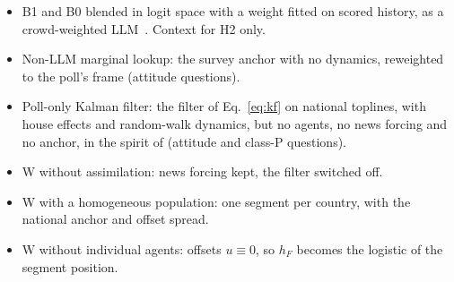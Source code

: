 \documentclass[11pt]{article}
\begin{document}
\begin{itemize}
  \item[\textbf{B4}] B1 and B0 blended in logit space with a weight fitted on scored history, as a crowd-weighted LLM~\citep{halawi2024approaching}. Context for H2 only.
  \item[\textbf{L}] Non-LLM marginal lookup: the survey anchor with no dynamics, reweighted to the poll's frame (attitude questions).
  \item[\textbf{P}] Poll-only Kalman filter: the filter of Eq.~\eqref{eq:kf} on national toplines, with house effects and random-walk dynamics, but no agents, no news forcing and no anchor, in the spirit of \citet{linzer2013dynamic} (attitude and class-P questions).
  \item[\textbf{A1}] W without assimilation: news forcing kept, the filter switched off.
  \item[\textbf{A2}] W with a homogeneous population: one segment per country, with the national anchor and offset spread.
  \item[\textbf{A3}] W without individual agents: offsets $u\equiv 0$, so $h_F$ becomes the logistic of the segment position.
\end{itemize}
\end{document}
